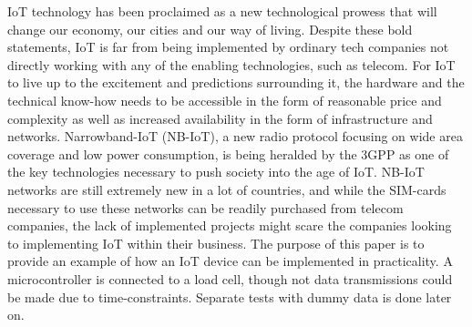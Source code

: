 IoT technology has been proclaimed as a new technological prowess that will change our economy, our cities and our way of living. Despite these bold statements, IoT is far from being implemented by
ordinary tech companies not directly working with any of the enabling technologies, such as telecom. For IoT to live up to the excitement and predictions surrounding it, the hardware and the technical know-how needs to be accessible in the form of reasonable price and complexity as well as increased availability in the form of infrastructure and networks. 
Narrowband-IoT (NB-IoT), a new radio protocol focusing on wide area coverage and low power consumption, is being heralded by the 3GPP as one of the key technologies necessary to push society into the age of IoT. NB-IoT networks are still extremely new in a lot of countries, and while the SIM-cards necessary to use these networks can be readily purchased from telecom companies, the lack of implemented projects might scare the companies looking to implementing IoT within their business. The purpose of this paper is to provide an example of how an IoT device can be implemented in practicality. A microcontroller is connected to a load cell, though not data transmissions could be made due to time-constraints. Separate tests with dummy data is done later on.
